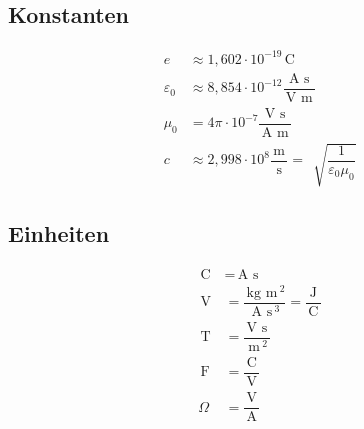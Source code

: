 \documentclass[a4paper,12pt]{article}
\numberwithin{equation}{section}
\begin{document}
\subsection{Konstanten}
\begin{align} 
        e&\approx 1,602\cdot 10^{-19}\,\text{C}\,\\
        \varepsilon _0&\approx 8,854\cdot 10^{-12}\dfrac{\,\text{A}\,\,\text{s}\,}{\,\text{V}\,\,\text{m}\,}\\
        \mu _0&=4\pi \cdot 10^{-7}\dfrac{\,\text{V}\,\,\text{s}\,}{\,\text{A}\,\,\text{m}\,}\\
        c&\approx 2,998\cdot 10^8\dfrac{\,\text{m}\,}{\,\text{s}\,}=\,\sqrt[]{\dfrac{1}{\varepsilon _0\mu _0}}
\end{align} 

\subsection{Einheiten}
\begin{align} 
        \,\text{C}\,&=\,\text{A}\,\,\text{s}\,\\
        \,\text{V}\,&=\dfrac{\,\text{kg}\,\,\text{m}\,^2}{\,\text{A}\,\,\text{s}\,^3}=\dfrac{\,\text{J}\,}{\,\text{C}\,}\\
        \,\text{T}\,&=\dfrac{\,\text{V}\,\,\text{s}\,}{\,\text{m}\,^2}\\
        \,\text{F}\,&=\dfrac{\,\text{C}\,}{\,\text{V}\,}\\
        \Omega &=\dfrac{\,\text{V}\,}{\,\text{A}\,}
\end{align} 




\newpage

\end{document}
